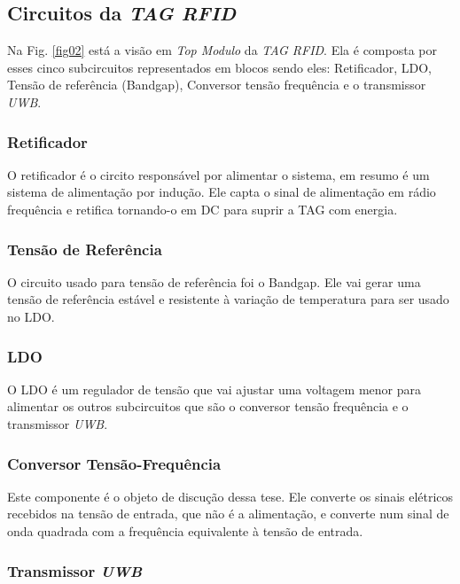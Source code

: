 \subsection{Circuitos da \textit{TAG RFID}}

Na Fig. \ref{fig02} está a visão em \textit{Top Modulo} da \textit{TAG RFID}. Ela é composta por esses cinco subcircuitos representados em blocos sendo eles: Retificador, LDO, Tensão de referência (Bandgap), Conversor tensão frequência e o transmissor \textit{UWB}.

\subsubsection{Retificador}

O retificador é o circito responsável por alimentar o sistema, em resumo é um sistema de alimentação por indução. Ele capta o sinal de alimentação em rádio frequência e retifica tornando-o em DC para suprir a TAG com energia. 

\subsubsection{Tensão de Referência}

O circuito usado para tensão de referência foi o Bandgap. Ele vai gerar uma tensão de referência estável e resistente à variação de temperatura para ser usado no LDO.

\subsubsection{LDO}

O LDO é um regulador de tensão que vai ajustar uma voltagem menor para alimentar os outros subcircuitos que são o conversor tensão frequência e o transmissor \textit{UWB}.

\subsubsection{Conversor Tensão-Frequência}

Este componente é o objeto de discução dessa tese. Ele converte os sinais elétricos recebidos na tensão de entrada, que não é a alimentação, e converte num sinal de onda quadrada com a frequência equivalente à tensão de entrada.

\subsubsection{Transmissor \textit{UWB}}


